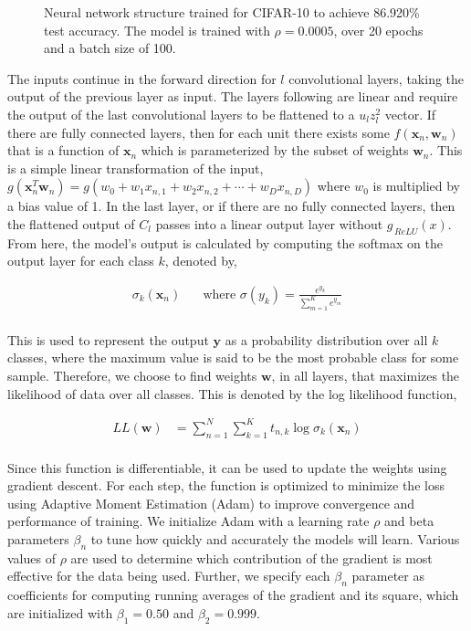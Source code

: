 \documentclass[conference]{IEEEtran}
\newcommand{\xv}{\mathbf{x}}
\newcommand{\yv}{\mathbf{y}}
\newcommand{\wv}{\mathbf{w}}
\begin{document}
\begin{figure*}[!t]
	\centering
	
    \captionsetup{width=1\linewidth}
	\caption{Neural network structure trained for CIFAR-10 to achieve 86.920\% test accuracy. The model is trained with $\rho = 0.0005$, over 20 epochs and a batch size of 100.}
	\label{fig:cifar_network_structure}
\end{figure*}

The inputs continue in the forward direction for $l$ convolutional layers, taking the output of the previous layer as input. The layers following are linear and require the output of the last convolutional layers to be flattened to a $u_l z_l^2$ vector. If there are fully connected layers, then for each unit there exists some $f(\xv_n, \wv_n)$ that is a function of $\xv_n$ which is parameterized by the subset of weights $\wv_n$. This is a simple linear transformation of the input, $g(\xv_n^T \wv_n) = g(w_0 + w_1 x_{n,1} + w_2 x_{n,2} + \cdots + w_D x_{n,D})$ where $w_0$ is multiplied by a bias value of 1. In the last layer, or if there are no fully connected layers, then the flattened output of $C_l$ passes into a linear output layer without $g_{\,ReLU}(x)$.
\newpage
From here, the model's output is calculated by computing the softmax on the output layer for each class $k$, denoted by,

\begin{align*}
\sigma_k(\xv_n)\;\;\;\;\; 
    \text{ where } \sigma(y_k) = \frac{e^{y_k}}{\sum_{m=1}^K e^{y_m}} \\
\end{align*}

This is used to represent the output $\yv$ as a probability distribution over all $k$ classes, where the maximum value is said to be the most probable class for some sample. Therefore, we choose to find weights $\wv$, in all layers, that maximizes the likelihood of data over all classes. This is denoted by the log likelihood function,

\begin{align*}
      LL(\wv) & = \sum_{n=1}^N \sum_{k=1}^K t_{n,k} \log \sigma_k(\xv_n) \\ 
\end{align*}

Since this function is differentiable, it can be used to update the weights using gradient descent. For each step, the function is optimized to minimize the loss using Adaptive Moment Estimation (Adam) to improve convergence and performance of training. We initialize Adam with a learning rate $\rho$ and beta parameters $\beta_n$ to tune how quickly and accurately the models will learn. Various values of $\rho$ are used to determine which contribution of the gradient is most effective for the data being used. Further, we specify each $\beta_n$ parameter as coefficients for computing running averages of the gradient and its square, which are initialized with $\beta_1 = 0.50$ and $\beta_2 = 0.999$.
\end{document}
